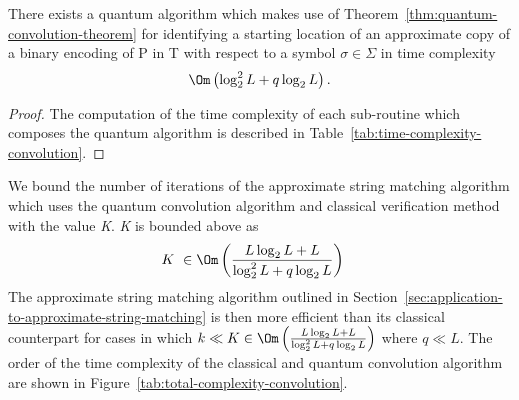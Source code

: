 \begin{lemma}\label{lem:quantum-convolution-time-complexity}
There exists a quantum algorithm which makes use of Theorem~\ref{thm:quantum-convolution-theorem} for identifying a starting location of an approximate copy of a binary encoding of P in T with respect to a symbol $\sigma \in \Sigma$ in time complexity
\[
	\Om\left(\log_2^2 L + q\log_2 L\right).
\]
\end{lemma}
\begin{proof}
The computation of the time complexity of each sub-routine which composes the quantum algorithm is described in Table~\ref{tab:time-complexity-convolution}.
\end{proof}

We bound the number of iterations of the approximate string matching algorithm which uses the quantum convolution algorithm and classical verification method with the value \textit{K}. \textit{K} is bounded above as
\begin{align}
	K \ &\in \Om\left(\frac{L\log_2 L + L}{\log_2^2 L + q\log_2 L}\right)
\end{align}
The approximate string matching algorithm outlined in Section~\ref{sec:application-to-approximate-string-matching} is then more efficient than its classical counterpart for cases in which $k \ll K \in  \Om\left(\frac{L\log_2 L + L}{\log_2^2 L + q\log_2 L}\right)$ where $q \ll L$. The order of the time complexity of the classical and quantum convolution algorithm are shown in Figure~\ref{tab:total-complexity-convolution}.

